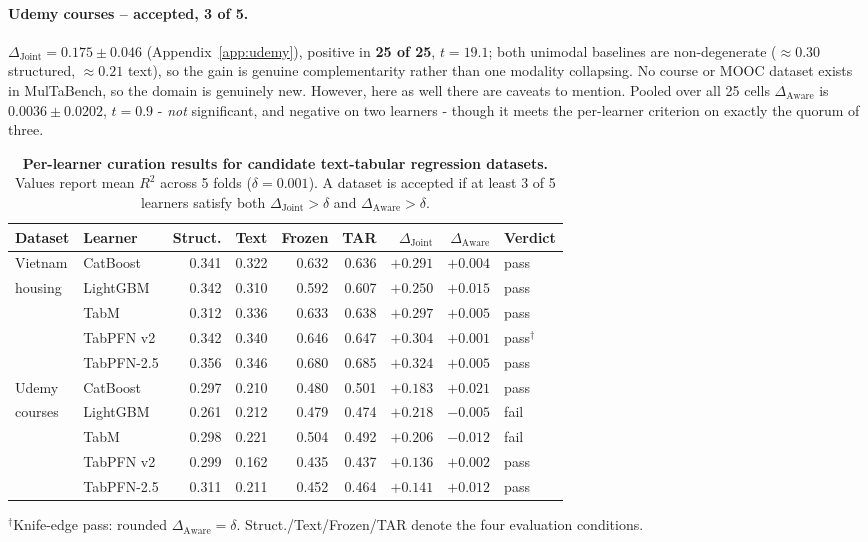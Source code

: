 \documentclass{article}
\newcommand{\djoint}{\Delta_{\text{Joint}}}
\newcommand{\daware}{\Delta_{\text{Aware}}}
\begin{document}
\paragraph{Udemy courses -- accepted, 3 of 5.} $\djoint = 0.175 \pm 0.046$
(Appendix~\ref{app:udemy}), positive in \textbf{25 of 25}, $t = 19.1$; both unimodal baselines
are non-degenerate ($\approx 0.30$ structured, $\approx 0.21$ text), so the gain is genuine
complementarity rather than one modality collapsing. No course or MOOC dataset exists in
MulTaBench, so the domain is genuinely new. However, here as well there are caveats to mention. Pooled over all 25
cells $\daware$ is $0.0036 \pm 0.0202$, $t = 0.9$ - \emph{not} significant, and negative on two
learners - though it meets the per-learner criterion on exactly the quorum of three.

\begin{table}[t]
\centering
\small
\caption{\textbf{Per-learner curation results for candidate text-tabular regression datasets.} Values report mean $R^2$ across 5 folds ($\delta = 0.001$). A dataset is accepted if at least 3 of 5 learners satisfy both $\Delta_{\text{Joint}} > \delta$ and $\Delta_{\text{Aware}} > \delta$.}
\label{tab:results}
\begin{tabular}{llrrrrrrl}
\toprule
Dataset & Learner & Struct. & Text & Frozen & TAR & $\Delta_{\text{Joint}}$ & $\Delta_{\text{Aware}}$ & Verdict \\
\midrule
Vietnam & CatBoost   & 0.341 & 0.322 & 0.632 & 0.636 & $+0.291$ & $+0.004$ & pass \\
housing & LightGBM   & 0.342 & 0.310 & 0.592 & 0.607 & $+0.250$ & $+0.015$ & pass \\
        & TabM       & 0.312 & 0.336 & 0.633 & 0.638 & $+0.297$ & $+0.005$ & pass \\
        & TabPFN v2  & 0.342 & 0.340 & 0.646 & 0.647 & $+0.304$ & $+0.001$ & pass$^{\dagger}$ \\
        & TabPFN-2.5 & 0.356 & 0.346 & 0.680 & 0.685 & $+0.324$ & $+0.005$ & pass \\
\midrule
Udemy   & CatBoost   & 0.297 & 0.210 & 0.480 & 0.501 & $+0.183$ & $+0.021$ & pass \\
courses & LightGBM   & 0.261 & 0.212 & 0.479 & 0.474 & $+0.218$ & $-0.005$ & fail \\
        & TabM       & 0.298 & 0.221 & 0.504 & 0.492 & $+0.206$ & $-0.012$ & fail \\
        & TabPFN v2  & 0.299 & 0.162 & 0.435 & 0.437 & $+0.136$ & $+0.002$ & pass \\
        & TabPFN-2.5 & 0.311 & 0.211 & 0.452 & 0.464 & $+0.141$ & $+0.012$ & pass \\
\bottomrule
\end{tabular}
\vspace{2pt}

\parbox{0.95\textwidth}{\footnotesize
$^{\dagger}$Knife-edge pass: rounded $\Delta_{\text{Aware}} = \delta$. Struct./Text/Frozen/TAR denote the four evaluation conditions.}
\end{table}
\end{document}
